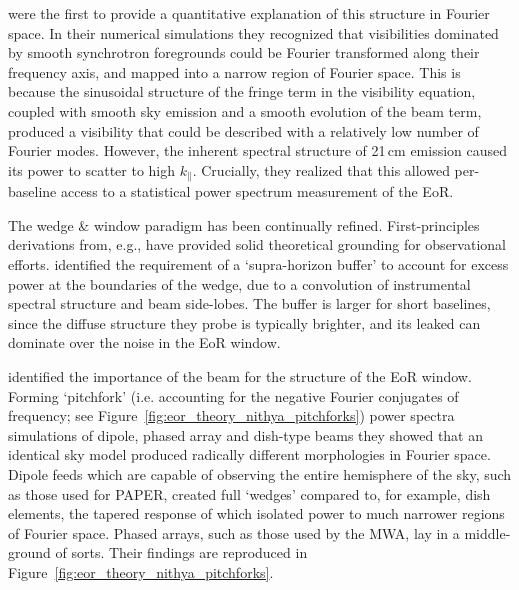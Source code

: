 \cite{Parsons.12a} were the first to provide a quantitative explanation of this structure in Fourier space. In their numerical simulations they recognized that visibilities dominated by smooth synchrotron foregrounds could be Fourier transformed along their frequency axis, and mapped into a narrow region of Fourier space. This is because the sinusoidal structure of the fringe term in the visibility equation, coupled with smooth sky emission and a smooth evolution of the beam term, produced a visibility that could be described with a relatively low number of Fourier modes. However, the inherent spectral structure of 21\,cm emission caused its power to scatter to high $k_{\parallel}$. Crucially, they realized that this allowed per-baseline access to a statistical power spectrum measurement of the EoR.

The wedge \& window paradigm has been continually refined. First-principles derivations from, e.g., \cite{Trott.12, Vedantham.12 ,Hazelton.13, Liu.14.1, Liu.14.2} have provided solid theoretical grounding for observational efforts. \cite{Pober.13} identified the requirement of a `supra-horizon buffer' to account for excess power at the boundaries of the wedge, due to a convolution of instrumental spectral structure and beam side-lobes. The buffer is larger for short baselines, since the diffuse structure they probe is typically brighter, and its leaked can dominate over the noise in the EoR window.

\cite{Nithya.15b} identified the importance of the beam for the structure of the EoR window. Forming `pitchfork' (i.e. accounting for the negative Fourier conjugates of frequency; see Figure~\ref{fig:eor_theory_nithya_pitchforks}) power spectra simulations of dipole, phased array and dish-type beams they showed that an identical sky model produced radically different morphologies in Fourier space. Dipole feeds which are capable of observing the entire hemisphere of the sky, such as those used for PAPER, created full `wedges' compared to, for example, dish elements, the tapered response of which isolated power to much narrower regions of Fourier space. Phased arrays, such as those used by the MWA, lay in a middle-ground of sorts. Their findings are reproduced in Figure~\ref{fig:eor_theory_nithya_pitchforks}.

